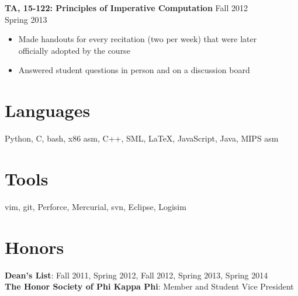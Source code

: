 \documentclass[margin]{res}
\begin{document}
\begin{resume}
  \textbf{TA, 15-122: Principles of Imperative Computation}
    \hfill Fall 2012\\ \hphantom{1em} \hfill Spring 2013

  \vspace{-1em}\vspace{-1ex}
  \begin{itemize} \itemsep -2pt
    \item Made handouts for every recitation (two per week) that were later\\
      officially adopted by the course
    \item Answered student questions in person and on a discussion board
  \end{itemize}

\section{Languages}
  Python, C, bash, x86 asm, C++, SML, \LaTeX, JavaScript, Java, MIPS asm

\section{Tools}
  vim, git, Perforce, Mercurial, svn, Eclipse, Logisim

\section{Honors}
  \textbf{Dean's List}: Fall 2011, Spring 2012, Fall 2012, Spring 2013, Spring 2014 \\
  \textbf{The Honor Society of Phi Kappa Phi}: Member and Student Vice President

\end{resume}
\end{document}

